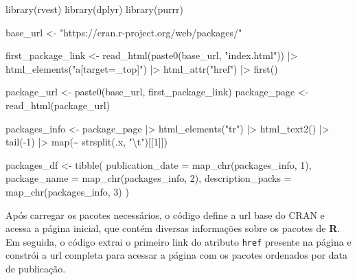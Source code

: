 \documentclass[
  12pt,
  a4paper,
]{scrreprt}
\newenvironment{Shaded}{}{}
\newcommand{\AttributeTok}[1]{\textcolor[rgb]{0.84,0.23,0.29}{#1}}
\newcommand{\DecValTok}[1]{\textcolor[rgb]{0.00,0.36,0.77}{#1}}
\newcommand{\FunctionTok}[1]{\textcolor[rgb]{0.44,0.26,0.76}{#1}}
\newcommand{\NormalTok}[1]{\textcolor[rgb]{0.14,0.16,0.18}{#1}}
\newcommand{\OtherTok}[1]{\textcolor[rgb]{0.44,0.26,0.76}{#1}}
\newcommand{\SpecialCharTok}[1]{\textcolor[rgb]{0.00,0.36,0.77}{#1}}
\newcommand{\StringTok}[1]{\textcolor[rgb]{0.01,0.18,0.38}{#1}}
\begin{document}
\begin{Shaded}
\begin{Highlighting}[]
\FunctionTok{library}\NormalTok{(rvest)}
\FunctionTok{library}\NormalTok{(dplyr)}
\FunctionTok{library}\NormalTok{(purrr)}

\NormalTok{base\_url }\OtherTok{\textless{}{-}} \StringTok{"https://cran.r{-}project.org/web/packages/"}

\NormalTok{first\_package\_link }\OtherTok{\textless{}{-}} \FunctionTok{read\_html}\NormalTok{(}\FunctionTok{paste0}\NormalTok{(base\_url, }\StringTok{"index.html"}\NormalTok{)) }\SpecialCharTok{|\textgreater{}}
    \FunctionTok{html\_elements}\NormalTok{(}\StringTok{"a[target=\_top]"}\NormalTok{) }\SpecialCharTok{|\textgreater{}}
    \FunctionTok{html\_attr}\NormalTok{(}\StringTok{"href"}\NormalTok{) }\SpecialCharTok{|\textgreater{}}
    \FunctionTok{first}\NormalTok{()}

\NormalTok{package\_url }\OtherTok{\textless{}{-}} \FunctionTok{paste0}\NormalTok{(base\_url, first\_package\_link)}
\NormalTok{package\_page }\OtherTok{\textless{}{-}} \FunctionTok{read\_html}\NormalTok{(package\_url)}

\NormalTok{packages\_info }\OtherTok{\textless{}{-}}\NormalTok{ package\_page }\SpecialCharTok{|\textgreater{}}
    \FunctionTok{html\_elements}\NormalTok{(}\StringTok{"tr"}\NormalTok{) }\SpecialCharTok{|\textgreater{}}
    \FunctionTok{html\_text2}\NormalTok{() }\SpecialCharTok{|\textgreater{}}
    \FunctionTok{tail}\NormalTok{(}\SpecialCharTok{{-}}\DecValTok{1}\NormalTok{) }\SpecialCharTok{|\textgreater{}}
    \FunctionTok{map}\NormalTok{(}\SpecialCharTok{\textasciitilde{}} \FunctionTok{strsplit}\NormalTok{(.x, }\StringTok{"}\SpecialCharTok{\textbackslash{}t}\StringTok{"}\NormalTok{)[[}\DecValTok{1}\NormalTok{]])}

\NormalTok{packages\_df }\OtherTok{\textless{}{-}} \FunctionTok{tibble}\NormalTok{(}
    \AttributeTok{publication\_date =} \FunctionTok{map\_chr}\NormalTok{(packages\_info, }\DecValTok{1}\NormalTok{),}
    \AttributeTok{package\_name =} \FunctionTok{map\_chr}\NormalTok{(packages\_info, }\DecValTok{2}\NormalTok{),}
    \AttributeTok{description\_packs =} \FunctionTok{map\_chr}\NormalTok{(packages\_info, }\DecValTok{3}\NormalTok{)}
\NormalTok{)}
\end{Highlighting}
\end{Shaded}

Após carregar os pacotes necessários, o código define a url base do CRAN
e acessa a página inicial, que contém diversas informações sobre os
pacotes de \textbf{R}. Em seguida, o código extrai o primeiro link do
atributo \texttt{href} presente na página e constrói a url completa para
acessar a página com os pacotes ordenados por data de publicação.
\end{document}
